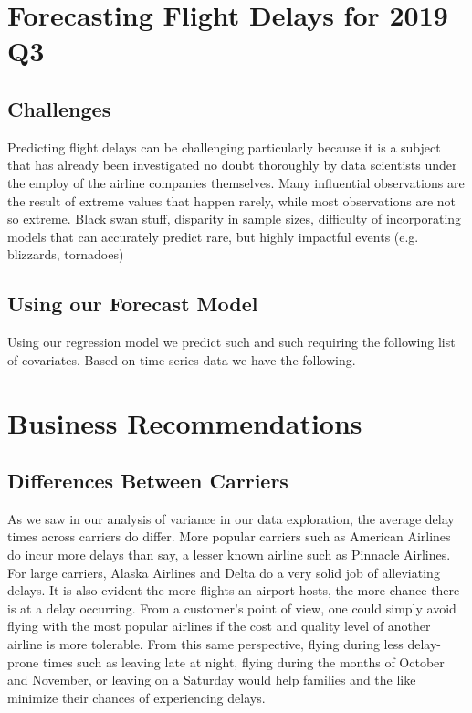 \documentclass[12pt, a4paper, openany]{book}
\newcommand\tab[1][1cm]{\hspace*{#1}}
\begin{document}
\chapter{Forecasting Flight Delays for 2019 Q3}
	\section{Challenges}
	\tab Predicting flight delays can be challenging particularly because it is a subject that has already been investigated no doubt thoroughly by data scientists under the employ of the airline companies themselves. Many influential observations are the result of extreme values that happen rarely, while most observations are not so extreme. Black swan stuff, disparity in sample sizes, difficulty of incorporating models that can accurately predict rare, but highly impactful events (e.g. blizzards, tornadoes)
	\section{Using our Forecast Model}
	\tab Using our regression  model we predict  such and such requiring the following list of covariates. Based on time series data we have the following.
\chapter{Business Recommendations}
	\section{Differences Between Carriers}
	\tab As we saw in our analysis of variance in our data exploration, the average delay times across carriers do differ. More popular carriers such as American Airlines do incur more delays than say, a lesser known airline such as Pinnacle Airlines. For large carriers, Alaska Airlines and Delta do a very solid job of alleviating delays. It is also evident the more flights an airport hosts, the more chance there is at a delay occurring. From a customer’s point of view, one could simply avoid flying with the most popular airlines if the cost and quality level of another airline is more tolerable. From this same perspective, flying during less delay-prone times such as leaving late at night, flying during the months of October and November, or leaving on a Saturday would help families and the like minimize their chances of experiencing delays. 
\end{document}

